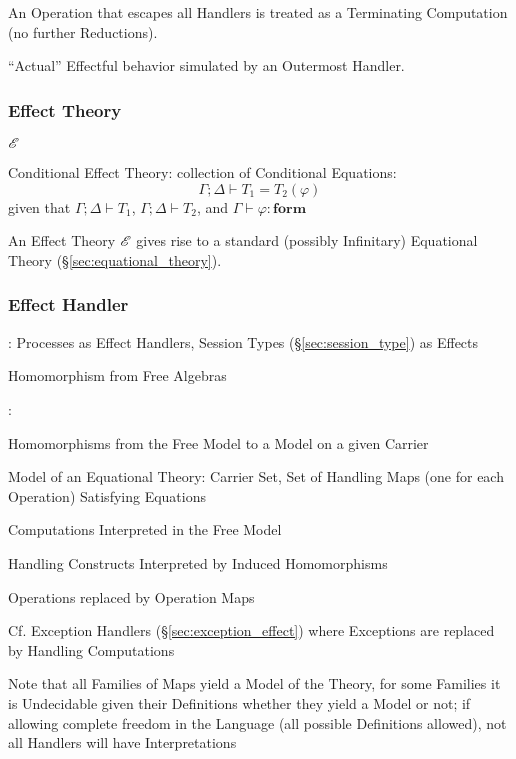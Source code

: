 An Operation that escapes all Handlers is treated as a Terminating
Computation (no further Reductions). \cite{pretnar15}

``Actual'' Effectful behavior simulated by an Outermost Handler.
\cite{pretnar15}



\subsubsection{Effect Theory}\label{sec:effect_theory}
\cite{plotkin-pretnar09}

$\mathscr{E}$

Conditional Effect Theory: collection of Conditional Equations:
\[
  \Gamma; \Delta \vdash T_1 = T_2(\varphi)
\]
given that $\Gamma; \Delta \vdash T_1$, $\Gamma; \Delta \vdash T_2$,
and $\Gamma \vdash \varphi : \mathbf{form}$

An Effect Theory $\mathscr{E}$ gives rise to a standard (possibly
Infinitary) Equational Theory (\S\ref{sec:equational_theory}).
\cite{plotkin-pretnar09}



\subsubsection{Effect Handler}\label{sec:effect_handler}

\cite{orchard-yoshida16}: Processes as Effect Handlers, Session Types
(\S\ref{sec:session_type}) as Effects

Homomorphism from Free Algebras
\cite{bauer-pretnar12}

\cite{plotkin-pretnar13}:

Homomorphisms from the Free Model to a Model on a given Carrier

Model of an Equational Theory: Carrier Set, Set of Handling Maps (one
for each Operation) Satisfying Equations

Computations Interpreted in the Free Model

Handling Constructs Interpreted by Induced Homomorphisms

Operations replaced by Operation Maps

\fist Cf. Exception Handlers (\S\ref{sec:exception_effect}) where
Exceptions are replaced by Handling Computations

\danger\; Note that all Families of Maps yield a Model of the Theory,
for some Families it is Undecidable given their Definitions whether
they yield a Model or not; if allowing complete freedom in the
Language (all possible Definitions allowed), not all Handlers will
have Interpretations


